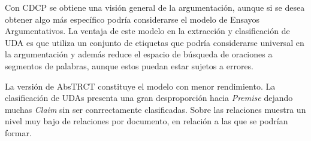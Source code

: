 Con CDCP se obtiene una visión general de la argumentación, aunque si se desea obtener algo 
más específico podría considerarse el modelo de Ensayos Argumentativos. La ventaja de este 
modelo en la extracción y clasificación de UDA es que utiliza un conjunto de etiquetas que 
podría considerarse universal en la argumentación y además reduce el espacio de búsqueda de 
oraciones a segmentos de palabras, aunque estos puedan estar sujetos a errores. 

La versión de AbsTRCT constituye el modelo con menor rendimiento. La clasificación
de UDAs presenta una gran desproporción hacia \emph{Premise} dejando muchas \emph{Claim}
sin ser conrrectamente clasificadas. Sobre las relaciones muestra un nivel muy bajo de 
relaciones por documento, en relación a las que se podrían formar.
